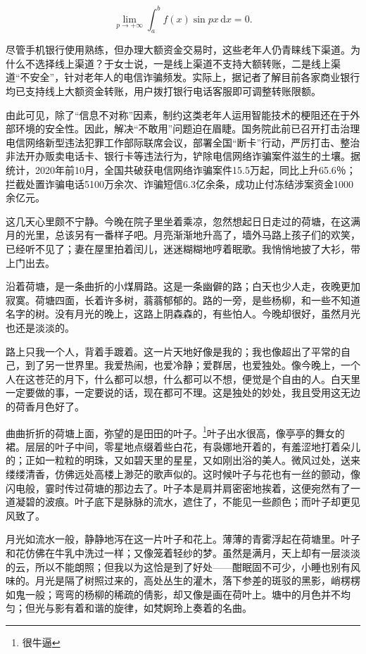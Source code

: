 \documentclass[printMode]{ecnuthesis}
\begin{document}
\[
  \lim_{p\to+\infty}\int_{a}^{b}f(x)\sin{px}\,\mathrm{d}x = 0.
\]

尽管手机银行使用熟练，但办理大额资金交易时，这些老年人仍青睐线下渠道。为什么不选择线上渠道？于女士说，一是线上渠道不支持大额转账，二是线上渠道“不安全”，针对老年人的电信诈骗频发。实际上，据记者了解目前各家商业银行均已支持线上大额资金转账，用户拨打银行电话客服即可调整转账限额。

由此可见，除了“信息不对称”因素，制约这类老年人运用智能技术的梗阻还在于外部环境的安全性。因此，解决“不敢用”问题迫在眉睫。国务院此前已召开打击治理电信网络新型违法犯罪工作部际联席会议，部署全国“断卡”行动，严厉打击、整治非法开办贩卖电话卡、银行卡等违法行为，铲除电信网络诈骗案件滋生的土壤。据统计，2020年前10月，全国共破获电信网络诈骗案件15.5万起，同比上升65.6％；拦截处置诈骗电话5100万余次、诈骗短信6.3亿余条，成功止付冻结涉案资金1000余亿元。

这几天心里颇不宁静。今晚在院子里坐着乘凉，忽然想起日日走过的荷塘，在这满月的光里，总该另有一番样子吧。月亮渐渐地升高了，墙外马路上孩子们的欢笑，已经听不见了；妻在屋里拍着闰儿，迷迷糊糊地哼着眠歌。我悄悄地披了大衫，带上门出去。

沿着荷塘，是一条曲折的小煤屑路。这是一条幽僻的路；白天也少人走，夜晚更加寂寞。荷塘四面，长着许多树，蓊蓊郁郁的。路的一旁，是些杨柳，和一些不知道名字的树。没有月光的晚上，这路上阴森森的，有些怕人。今晚却很好，虽然月光也还是淡淡的。

路上只我一个人，背着手踱着。这一片天地好像是我的；我也像超出了平常的自己，到了另一世界里。我爱热闹，也爱冷静；爱群居，也爱独处。像今晚上，一个人在这苍茫的月下，什么都可以想，什么都可以不想，便觉是个自由的人。白天里一定要做的事，一定要说的话，现在都可不理。这是独处的妙处，我且受用这无边的荷香月色好了。

曲曲折折的荷塘上面，弥望的是田田的叶子。\footnote{很牛逼}叶子出水很高，像亭亭的舞女的裙。层层的叶子中间，零星地点缀着些白花，有袅娜地开着的，有羞涩地打着朵儿的；正如一粒粒的明珠，又如碧天里的星星，又如刚出浴的美人。微风过处，送来缕缕清香，仿佛远处高楼上渺茫的歌声似的。这时候叶子与花也有一丝的颤动，像闪电般，霎时传过荷塘的那边去了。叶子本是肩并肩密密地挨着，这便宛然有了一道凝碧的波痕。叶子底下是脉脉的流水，遮住了，不能见一些颜色；而叶子却更见风致了。

月光如流水一般，静静地泻在这一片叶子和花上。薄薄的青雾浮起在荷塘里。叶子和花仿佛在牛乳中洗过一样；又像笼着轻纱的梦。虽然是满月，天上却有一层淡淡的云，所以不能朗照；但我以为这恰是到了好处——酣眠固不可少，小睡也别有风味的。月光是隔了树照过来的，高处丛生的灌木，落下参差的斑驳的黑影，峭楞楞如鬼一般；弯弯的杨柳的稀疏的倩影，却又像是画在荷叶上。塘中的月色并不均匀；但光与影有着和谐的旋律，如梵婀玲上奏着的名曲。
\end{document}
